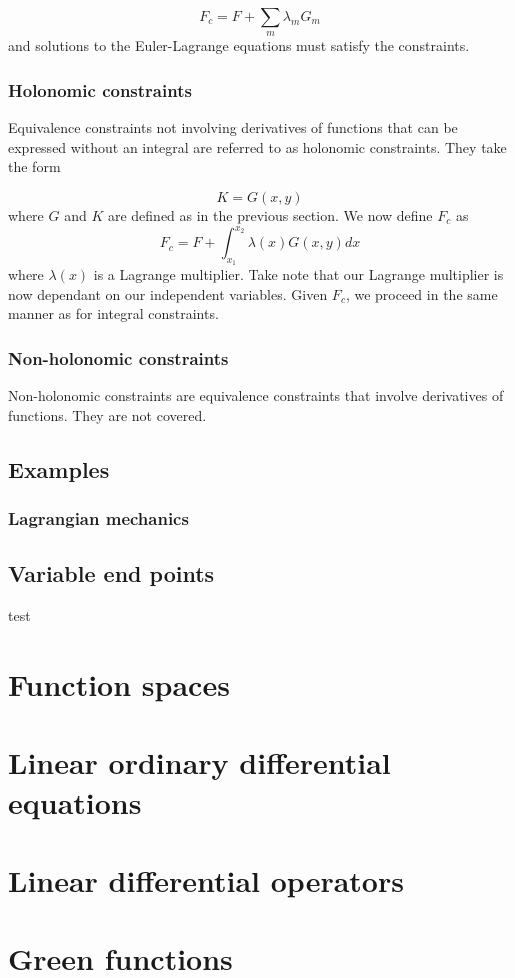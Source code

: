 \documentclass[]{article}
\begin{document}
\begin{equation*} F_{c} = F + \sum_{m} \lambda_{m} G_{m} \end{equation*}
and solutions to the Euler-Lagrange equations must satisfy the constraints.
\subsubsection{Holonomic constraints}
Equivalence constraints not involving derivatives of functions that can be expressed without an integral are referred to as holonomic constraints. They take the form

\begin{equation} K = G(x,y) \end{equation}
where $G$ and $K$ are defined as in the previous section. We now define $F_{c}$ as
\begin{equation} F_{c} = F + \int_{x_{1}}^{x_{2}} \lambda (x) G(x,y)dx \end{equation}
where $\lambda (x)$ is a Lagrange multiplier. Take note that our Lagrange multiplier is now dependant on our independent variables. Given $F_{c}$, we proceed in the same manner as for integral constraints.
\subsubsection{Non-holonomic constraints}
Non-holonomic constraints are equivalence constraints that involve derivatives of functions. They are not covered.
\subsection{Examples}
\subsubsection{Lagrangian mechanics}
\subsection{Variable end points}
test
\nocite{*}




\section{Function spaces}

\section{Linear ordinary differential equations}

\section{Linear differential operators}

\section{Green functions}
\end{document}
